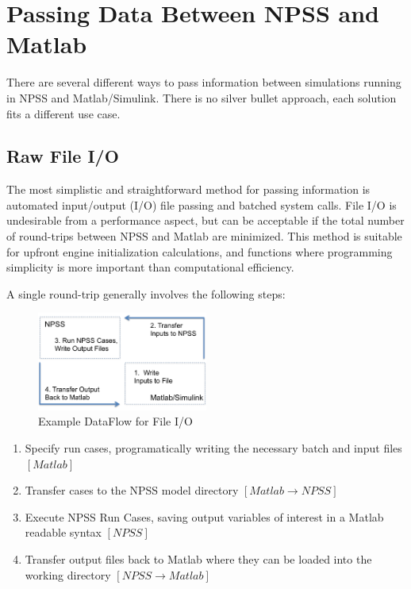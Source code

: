 \documentclass[heading.tex]{subfiles}
\begin{document}
\section{Passing Data Between NPSS and Matlab}

There are several different ways to pass information between simulations
running in NPSS and Matlab/Simulink. There is no silver bullet approach,
each solution fits a different use case.

\subsection{Raw File I/O}

The most simplistic and straightforward method for passing information is automated
input/output (I/O) file passing and batched system calls.
File I/O is undesirable from a performance aspect,
but can be acceptable if the total number of round-trips between
NPSS and Matlab are minimized.
This method is suitable for upfront engine initialization calculations, 
and functions where programming simplicity is more important than computational efficiency.

A single round-trip generally involves the following steps:

\begin{figure}[H]
\centering
\includegraphics[width=0.5\textwidth]{images/roundTrip}
\caption{Example DataFlow for File I/O}
\label{f:roundTrip}
\end{figure}

\begin{enumerate}
  \item Specify run cases, programatically writing the necessary batch and input files $[Matlab]$
  \item Transfer cases to the NPSS model directory $[Matlab \rightarrow NPSS]$
  \item Execute NPSS Run Cases, saving output variables of interest in a Matlab readable syntax $[NPSS]$
  \item Transfer output files back to Matlab where they can be loaded into the working directory $[NPSS \rightarrow Matlab]$
\end{enumerate}
\end{document}
